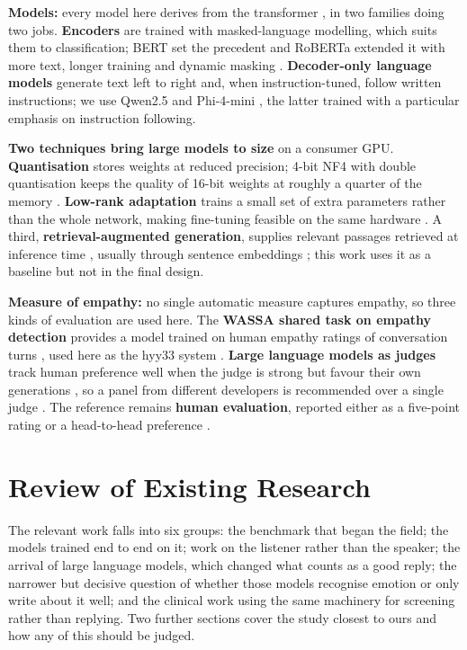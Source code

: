 \textbf{Models:} every model here derives from the transformer \cite{vaswani2017}, in two families doing two jobs. \textbf{Encoders }are trained with masked-language modelling, which suits them to classification; BERT set the precedent \cite{devlin2019} and RoBERTa extended it with more text, longer training and dynamic masking \cite{liu2019roberta}. \textbf{Decoder-only language models} generate text left to right and, when instruction-tuned, follow written instructions; we use Qwen2.5 \cite{qwen2024} and Phi-4-mini \cite{abouelenin2025phi4mini}, the latter trained with a particular emphasis on instruction following.

\textbf{Two techniques bring large models to size} on a consumer GPU. \textbf{Quantisation }stores weights at reduced precision; 4-bit NF4 with double quantisation keeps the quality of 16-bit weights at roughly a quarter of the memory \cite{dettmers2023qlora}. \textbf{Low-rank adaptation} trains a small set of extra parameters rather than the whole network, making fine-tuning feasible on the same hardware \cite{hu2022lora}. A third, \textbf{retrieval-augmented generation}, supplies relevant passages retrieved at inference time \cite{lewis2020rag}, usually through sentence embeddings \cite{reimers2019sbert}; this work uses it as a baseline but not in the final design.

\textbf{Measure of empathy:} no single automatic measure captures empathy, so three kinds of evaluation are used here. The\textbf{ WASSA shared task on empathy detection }provides a model trained on human empathy ratings of conversation turns \cite{giorgi2024wassa}, used here as the hyy33 system \cite{yang2024hyy33}.\textbf{ Large language models as judges} track human preference well when the judge is strong \cite{zheng2023judge} but favour their own generations \cite{panickssery2024}, so a panel from different developers is recommended over a single judge \cite{verga2024}. The reference remains \textbf{human evaluation}, reported either as a five-point rating \cite{qian2023llm} or a head-to-head preference \cite{cao2025tooled}.

\section{Review of Existing Research}
\label{sec:2.2}

The relevant work falls into six groups: the benchmark that began the field; the models trained end to end on it; work on the listener rather than the speaker; the arrival of large language models, which changed what counts as a good reply; the narrower but decisive question of whether those models recognise emotion or only write about it well; and the clinical work using the same machinery for screening rather than replying. Two further sections cover the study closest to ours and how any of this should be judged.

